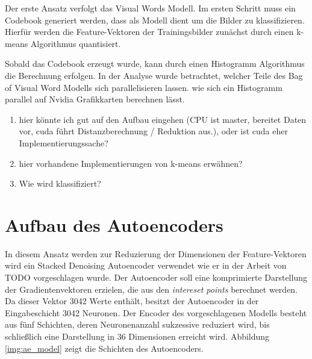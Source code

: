 Der erste Ansatz verfolgt das Visual Words Modell. Im ersten Schritt muss ein Codebook generiert werden, dass als Modell dient um die Bilder zu klassifizieren. Hierfür werden die Feature-Vektoren der Trainingsbilder zunächst durch einen k-means Algorithmus quantisiert.

Sobald das Codebook erzeugt wurde, kann durch einen Histogramm Algorithmus die Berechnung erfolgen. In der Analyse wurde betrachtet, welcher Teile des Bag of Visual Word Modells sich parallelisieren lassen. wie sich ein Histogramm parallel auf Nvidia Grafikkarten berechnen lässt. 

\begin{enumerate}
	\item hier könnte ich gut auf den Aufbau eingehen (CPU ist master, bereitet Daten vor, cuda führt Distanzberechnung / Reduktion aus.), oder ist cuda eher Implementierungssache?
	\item hier vorhandene Implementierungen von k-means erwähnen?
	\item Wie wird klassifiziert?
\end{enumerate}

\section{Aufbau des Autoencoders}

In diesem Ansatz werden zur Reduzierung der Dimensionen der Feature-Vektoren wird ein Stacked Denoising Autoencoder verwendet wie er in der Arbeit von TODO \cite{aed2016} vorgeschlagen wurde. Der Autoencoder soll eine komprimierte Darstellung der Gradientenvektoren erzielen, die aus den \textit{intereset points} berechnet werden. Da dieser Vektor 3042 Werte enthält, besitzt der Autoencoder in der Eingabeschicht 3042 Neuronen. Der Encoder des vorgeschlagenen Modells besteht aus fünf Schichten, deren Neuronenanzahl sukzessive reduziert wird, bis schließlich eine Darstellung in 36 Dimensionen erreicht wird. Abbildung \ref{img:ae_model} zeigt die Schichten des Autoencoders.

